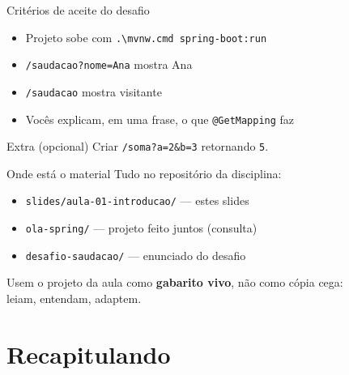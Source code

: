 \documentclass[aspectratio=169,11pt]{beamer}
\begin{document}
\begin{frame}{Critérios de aceite do desafio}
  \begin{itemize}
    \item [ ] Projeto sobe com \texttt{.\textbackslash{}mvnw.cmd spring-boot:run}
    \item [ ] \texttt{/saudacao?nome=Ana} mostra Ana
    \item [ ] \texttt{/saudacao} mostra visitante
    \item [ ] Vocês explicam, em uma frase, o que \texttt{@GetMapping} faz
  \end{itemize}

  \vspace{0.8em}
  \begin{block}{Extra (opcional)}
    Criar \texttt{/soma?a=2\&b=3} retornando \texttt{5}.
  \end{block}
\end{frame}

\begin{frame}{Onde está o material}
  Tudo no repositório da disciplina:

  \vspace{0.5em}
  \begin{itemize}
    \item \texttt{slides/aula-01-introducao/} --- estes slides
    \item \texttt{ola-spring/} --- projeto feito juntos (consulta)
    \item \texttt{desafio-saudacao/} --- enunciado do desafio
  \end{itemize}

  \vspace{0.6em}
  Usem o projeto da aula como \textbf{gabarito vivo}, não como cópia cega:\\
  leiam, entendam, adaptem.
\end{frame}

\section{Recapitulando}
\end{document}
